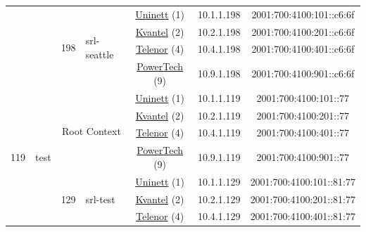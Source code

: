 \begin{small}
\begin{center}
\begin{longtable}{|c|c|c|c|c|c|c|c|}
  &  & \multirow{4}{*}{\tiny{198}} & \multicolumn{1}{|l|}{\multirow{4}{*}{\tiny{srl-seattle}}} & \multicolumn{2}{|c|}{\tiny{\href{https://www.uninett.no}{Uninett} (1)}} & \tiny{10.1.1.198} & \tiny{2001:700:4100:101::c6:6f} \\* \cline{5-5}\cline{6-6}\cline{7-7}\cline{8-8}
  &  &  &  & \multicolumn{2}{|c|}{\tiny{\href{http://kvantel.no}{Kvantel} (2)}} & \tiny{10.2.1.198} & \tiny{2001:700:4100:201::c6:6f} \\* \cline{5-5}\cline{6-6}\cline{7-7}\cline{8-8}
  &  &  &  & \multicolumn{2}{|c|}{\tiny{\href{https://www.telenor.no}{Telenor} (4)}} & \tiny{10.4.1.198} & \tiny{2001:700:4100:401::c6:6f} \\* \cline{5-5}\cline{6-6}\cline{7-7}\cline{8-8}
  &  &  &  & \multicolumn{2}{|c|}{\tiny{\href{http://www.powertech.no}{PowerTech} (9)}} & \tiny{10.9.1.198} & \tiny{2001:700:4100:901::c6:6f} \\ \hline
 \multirow{24}{*}{\tiny{119}} & \multicolumn{1}{|l|}{\multirow{24}{*}{\tiny{test}}} & \multicolumn{2}{|c|}{\multirow{4}{*}{\tiny{Root Context}}} & \multicolumn{2}{|c|}{\tiny{\href{https://www.uninett.no}{Uninett} (1)}} & \tiny{10.1.1.119} & \tiny{2001:700:4100:101::77} \\* \cline{5-5}\cline{6-6}\cline{7-7}\cline{8-8}
  &  & \multicolumn{2}{|c|}{} & \multicolumn{2}{|c|}{\tiny{\href{http://kvantel.no}{Kvantel} (2)}} & \tiny{10.2.1.119} & \tiny{2001:700:4100:201::77} \\* \cline{5-5}\cline{6-6}\cline{7-7}\cline{8-8}
  &  & \multicolumn{2}{|c|}{} & \multicolumn{2}{|c|}{\tiny{\href{https://www.telenor.no}{Telenor} (4)}} & \tiny{10.4.1.119} & \tiny{2001:700:4100:401::77} \\* \cline{5-5}\cline{6-6}\cline{7-7}\cline{8-8}
  &  & \multicolumn{2}{|c|}{} & \multicolumn{2}{|c|}{\tiny{\href{http://www.powertech.no}{PowerTech} (9)}} & \tiny{10.9.1.119} & \tiny{2001:700:4100:901::77} \\* \cline{3-3}\cline{4-4}\cline{5-5}\cline{6-6}\cline{7-7}\cline{8-8}
  &  & \multirow{4}{*}{\tiny{129}} & \multicolumn{1}{|l|}{\multirow{4}{*}{\tiny{srl-test}}} & \multicolumn{2}{|c|}{\tiny{\href{https://www.uninett.no}{Uninett} (1)}} & \tiny{10.1.1.129} & \tiny{2001:700:4100:101::81:77} \\* \cline{5-5}\cline{6-6}\cline{7-7}\cline{8-8}
  &  &  &  & \multicolumn{2}{|c|}{\tiny{\href{http://kvantel.no}{Kvantel} (2)}} & \tiny{10.2.1.129} & \tiny{2001:700:4100:201::81:77} \\* \cline{5-5}\cline{6-6}\cline{7-7}\cline{8-8}
  &  &  &  & \multicolumn{2}{|c|}{\tiny{\href{https://www.telenor.no}{Telenor} (4)}} & \tiny{10.4.1.129} & \tiny{2001:700:4100:401::81:77} \\* \cline{5-5}\cline{6-6}\cline{7-7}\cline{8-8}

\end{longtable}
\end{center}
\end{small}
